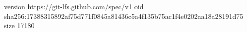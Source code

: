 version https://git-lfs.github.com/spec/v1
oid sha256:17388315892af75d771f0845a81436c5a4f135b75ac1f4e0202aa18a28191d75
size 17180
